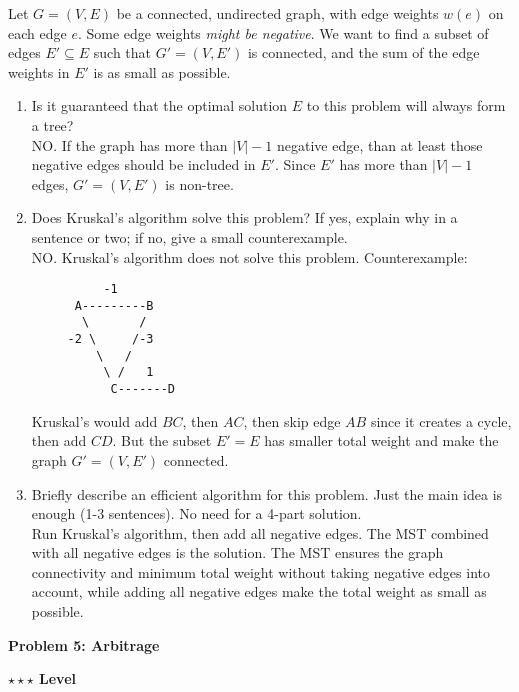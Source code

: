 \documentclass{article}\usepackage[utf8]{inputenc}
\begin{document}
\noindent Let $G = (V, E)$ be a connected, undirected graph, with edge weights $w(e)$ on each edge $e$. Some edge weights \textit{might be negative}. We want to find a subset of edges $E' \subseteq E$ such that $G' = (V, E')$ is connected, and the sum of the edge weights in $E'$ is as small as possible.
\begin{enumerate}[1.]
\item Is it guaranteed that the optimal solution $E$ to this problem will always form a tree?
\BeginSolution %
\\
NO. If the graph has more than $\vert V\vert - 1$ negative edge, than at least those negative edges should be included in $E'$. Since $E'$ has more than $\vert V\vert - 1$ edges, $G' = (V, E')$ is non-tree.
\EndSolution
\item Does Kruskal's algorithm solve this problem? If yes, explain why in a sentence or two; if no, give a small counterexample.
\BeginSolution %
\\
NO. Kruskal's algorithm does not solve this problem. Counterexample:
%
\begin{lstlisting}
	      -1
	  A---------B
	   \       /
	 -2 \     /-3
	     \   /
	      \ /   1
	       C-------D
\end{lstlisting}
%
Kruskal's would add $BC$, then $AC$, then skip edge $AB$ since it creates a cycle, then add $CD$. But the subset $E'=E$ has smaller total weight and make the graph $G' = (V,E')$ connected.
\EndSolution
\item Briefly describe an efficient algorithm for this problem. Just the main idea is enough (1-3 sentences). No need for a 4-part solution.
\BeginSolution %
\\
Run Kruskal's algorithm, then add all negative edges. The MST combined with all negative edges is the solution. The MST ensures the graph connectivity and minimum total weight without taking negative edges into account, while adding all negative edges make the total weight as small as possible.
\EndSolution
\end{enumerate}
\clearpage

\vspace{-2mm}\noindent\begin{mybox}{\begin{center}\textbf{\color{black}Problem 5: Arbitrage}\end{center}}\end{mybox}\vspace{-2mm}
\begin{myboxot}\noindent\textbf{$\star\star\star$ Level}\end{myboxot} 
\end{document}
